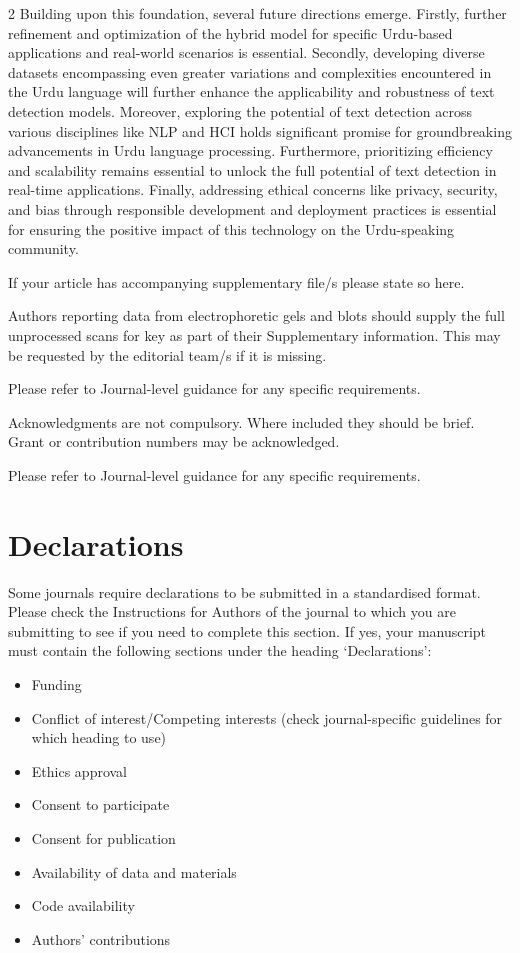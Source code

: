 \documentclass[sn-mathphys,Numbered]{sn-jnl}%
\begin{document}
\begin{multicols}{2}
Building upon this foundation, several future directions emerge. Firstly, further refinement and optimization of the hybrid model for specific Urdu-based applications and real-world scenarios is essential. Secondly, developing diverse datasets encompassing even greater variations and complexities encountered in the Urdu language will further enhance the applicability and robustness of text detection models. Moreover, exploring the potential of text detection across various disciplines like NLP and HCI holds significant promise for groundbreaking advancements in Urdu language processing. Furthermore, prioritizing efficiency and scalability remains essential to unlock the full potential of text detection in real-time applications. Finally, addressing ethical concerns like privacy, security, and bias through responsible development and deployment practices is essential for ensuring the positive impact of this technology on the Urdu-speaking community.
\backmatter


If your article has accompanying supplementary file/s please state so here. 

Authors reporting data from electrophoretic gels and blots should supply the full unprocessed scans for key as part of their Supplementary information. This may be requested by the editorial team/s if it is missing.

Please refer to Journal-level guidance for any specific requirements.


Acknowledgments are not compulsory. Where included they should be brief. Grant or contribution numbers may be acknowledged.

Please refer to Journal-level guidance for any specific requirements.

\section*{Declarations}

Some journals require declarations to be submitted in a standardised format. Please check the Instructions for Authors of the journal to which you are submitting to see if you need to complete this section. If yes, your manuscript must contain the following sections under the heading `Declarations':

\begin{itemize}
\item Funding
\item Conflict of interest/Competing interests (check journal-specific guidelines for which heading to use)
\item Ethics approval 
\item Consent to participate
\item Consent for publication
\item Availability of data and materials
\item Code availability 
\item Authors' contributions
\end{itemize}


\end{multicols}
\end{document}
